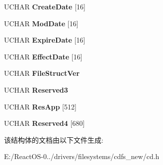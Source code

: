 \begin{DoxyCompactItemize}
\item 
\mbox{\label{struct___r_a_w___h_s_g___v_d_a8f02077cca9580384842dd1814166779}} 
U\+C\+H\+AR {\bfseries Create\+Date} \mbox{[}16\mbox{]}
\item 
\mbox{\label{struct___r_a_w___h_s_g___v_d_a2010da5e2c3d04e9fd498b4d18845c82}} 
U\+C\+H\+AR {\bfseries Mod\+Date} \mbox{[}16\mbox{]}
\item 
\mbox{\label{struct___r_a_w___h_s_g___v_d_af25ee65a473e99a5a743910df7943b42}} 
U\+C\+H\+AR {\bfseries Expire\+Date} \mbox{[}16\mbox{]}
\item 
\mbox{\label{struct___r_a_w___h_s_g___v_d_aa3df282242f7eae2fcfca2f4ea7c40c7}} 
U\+C\+H\+AR {\bfseries Effect\+Date} \mbox{[}16\mbox{]}
\item 
\mbox{\label{struct___r_a_w___h_s_g___v_d_ac395842f3acb4ffb7bf4322788ba599f}} 
U\+C\+H\+AR {\bfseries File\+Struct\+Ver}
\item 
\mbox{\label{struct___r_a_w___h_s_g___v_d_a952d416ed27867346c5b838941b9aa86}} 
U\+C\+H\+AR {\bfseries Reserved3}
\item 
\mbox{\label{struct___r_a_w___h_s_g___v_d_a46d1245c433b0b34362c26c1a4e0adc1}} 
U\+C\+H\+AR {\bfseries Res\+App} \mbox{[}512\mbox{]}
\item 
\mbox{\label{struct___r_a_w___h_s_g___v_d_ad1948530ad68451b8e4549589a4cbd23}} 
U\+C\+H\+AR {\bfseries Reserved4} \mbox{[}680\mbox{]}
\end{DoxyCompactItemize}


该结构体的文档由以下文件生成\+:\begin{DoxyCompactItemize}
\item 
E\+:/\+React\+O\+S-\/0../drivers/filesystems/cdfs\+\_\+new/cd.\+h\end{DoxyCompactItemize}
